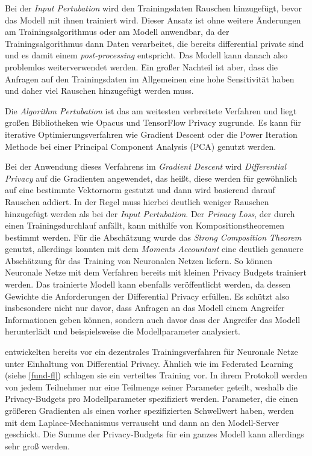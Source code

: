 Bei der \textit{Input Pertubation} wird den Trainingsdaten Rauschen hinzugefügt, bevor das Modell mit ihnen trainiert wird. Dieser Ansatz ist ohne weitere Änderungen am Trainingsalgorithmus oder am Modell anwendbar, da der Trainingsalgorithmus dann Daten verarbeitet, die bereits differential private sind und es damit einem \textit{post-processing} entspricht. Das Modell kann danach also problemlos weiterverwendet werden. Ein großer Nachteil ist aber, dass die Anfragen auf den Trainingsdaten im Allgemeinen eine hohe Sensitivität haben und daher viel Rauschen hinzugefügt werden muss.

Die \textit{Algorithm Pertubation} ist das am weitesten verbreitete Verfahren und liegt großen Bibliotheken wie Opacus \cite{yousefpour:2021} und TensorFlow Privacy \cite{tfprivacy} zugrunde. Es kann für iterative Optimierungsverfahren wie Gradient Descent oder die Power Iteration Methode bei einer Principal Component Analysis (PCA) genutzt werden.

Bei der Anwendung dieses Verfahrens im \textit{Gradient Descent} wird \textit{Differential Privacy} auf die Gradienten angewendet, das heißt, diese werden für gewöhnlich auf eine bestimmte Vektornorm gestutzt und dann wird basierend darauf Rauschen addiert. In der Regel muss hierbei deutlich weniger Rauschen hinzugefügt werden als bei der \textit{Input Pertubation}.\cite{chang:2023} Der \textit{Privacy Loss}, der durch einen Trainingsdurchlauf anfällt, kann mithilfe von Kompositionstheoremen bestimmt werden. Für die Abschätzung wurde das \textit{Strong Composition Theorem}\cite{dwork:2010} genutzt, allerdings konnten \textcite{abadi:2016} mit dem \textit{Moments Accountant} eine deutlich genauere Abschätzung für das Training von Neuronalen Netzen liefern. So können Neuronale Netze mit dem Verfahren bereits mit kleinen Privacy Budgets trainiert werden. Das trainierte Modell kann ebenfalls veröffentlicht werden, da dessen Gewichte die Anforderungen der Differential Privacy erfüllen. Es schützt also insbesondere nicht nur davor, dass Anfragen an das Modell einem Angreifer Informationen geben können, sondern auch davor dass der Angreifer das Modell herunterlädt und beispielsweise die Modellparameter analysiert.

\textcite{shokri:2015} entwickelten bereits vor \textcite{abadi:2016} ein dezentrales Trainingsverfahren für Neuronale Netze unter Einhaltung von Differential Privacy. Ähnlich wie im Federated Learning (siehe \autoref{fund-fl}) schlagen sie ein verteiltes Training vor. In ihrem Protokoll werden von jedem Teilnehmer nur eine Teilmenge seiner Parameter geteilt, weshalb die Privacy-Budgets pro Modellparameter spezifiziert werden. Parameter, die einen größeren Gradienten als einen vorher spezifizierten Schwellwert haben, werden mit dem Laplace-Mechanismus verrauscht und dann an den Modell-Server geschickt. Die Summe der Privacy-Budgets für ein ganzes Modell kann allerdings sehr groß werden\cite[p.10]{abadi:2016}.

